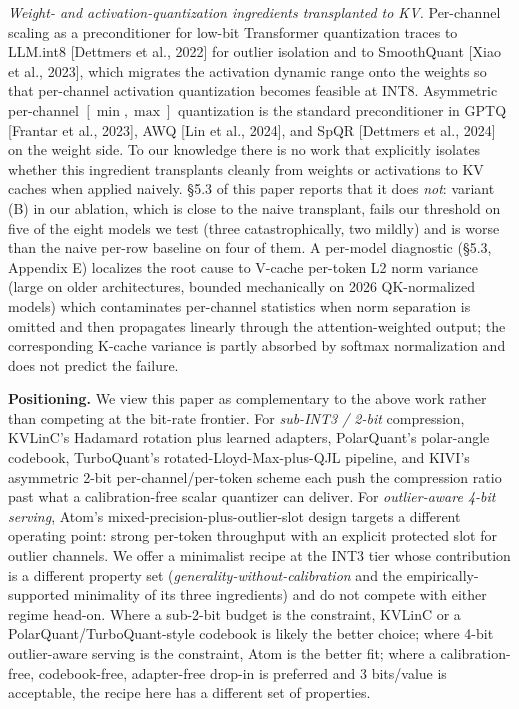 \emph{Weight- and activation-quantization ingredients transplanted to
KV.} Per-channel scaling as a preconditioner for low-bit Transformer
quantization traces to LLM.int8 {[}Dettmers et al., 2022{]} for outlier
isolation and to SmoothQuant {[}Xiao et al., 2023{]}, which migrates the
activation dynamic range onto the weights so that per-channel activation
quantization becomes feasible at INT8. Asymmetric per-channel
\([\min, \max]\) quantization is the standard preconditioner in GPTQ
{[}Frantar et al., 2023{]}, AWQ {[}Lin et al., 2024{]}, and SpQR
{[}Dettmers et al., 2024{]} on the weight side. To our knowledge there
is no work that explicitly isolates whether this ingredient transplants
cleanly from weights or activations to KV caches when applied naively.
§5.3 of this paper reports that it does \emph{not}: variant (B) in our
ablation, which is close to the naive transplant, fails our threshold on
five of the eight models we test (three catastrophically, two mildly)
and is worse than the naive per-row baseline on four of them. A
per-model diagnostic (§5.3, Appendix E) localizes the root cause to
V-cache per-token L2 norm variance (large on older architectures,
bounded mechanically on 2026 QK-normalized models) which contaminates
per-channel statistics when norm separation is omitted and then
propagates linearly through the attention-weighted output; the
corresponding K-cache variance is partly absorbed by softmax
normalization and does not predict the failure.

\textbf{Positioning.} We view this paper as complementary to the above
work rather than competing at the bit-rate frontier. For \emph{sub-INT3
/ 2-bit} compression, KVLinC's Hadamard rotation plus learned adapters,
PolarQuant's polar-angle codebook, TurboQuant's
rotated-Lloyd-Max-plus-QJL pipeline, and KIVI's asymmetric 2-bit
per-channel/per-token scheme each push the compression ratio past what a
calibration-free scalar quantizer can deliver. For \emph{outlier-aware
4-bit serving}, Atom's mixed-precision-plus-outlier-slot design targets
a different operating point: strong per-token throughput with an
explicit protected slot for outlier channels. We offer a minimalist
recipe at the INT3 tier whose contribution is a different property set
(\emph{generality-without-calibration} and the empirically-supported
minimality of its three ingredients) and do not compete with either
regime head-on. Where a sub-2-bit budget is the constraint, KVLinC or a
PolarQuant/TurboQuant-style codebook is likely the better choice; where
4-bit outlier-aware serving is the constraint, Atom is the better fit;
where a calibration-free, codebook-free, adapter-free drop-in is
preferred and 3 bits/value is acceptable, the recipe here has a
different set of properties.

